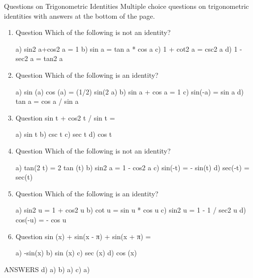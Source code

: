 \documentclass[]{report}
\begin{document}
Questions on Trigonometric Identities
Multiple choice questions on trigonometric identities with answers at the bottom of the page. 

\begin{enumerate}
\item Question Which of the following is not an identity? 

a) sin2 a+cos2 a = 1 
b) sin a = tan a * cos a 
c) 1 + cot2 a = csc2 a 
d) 1 - sec2 a = tan2 a 


\item Question Which of the following is an identity? 

a) sin (a) cos (a) = (1/2) sin(2 a) 
b) sin a + cos a = 1 
c) sin(-a) = sin a 
d) tan a = cos a / sin a 

\item Question 
sin t + cos2 t / sin t = 


a) sin t 
b) csc t 
c) sec t 
d) cos t 



\item Question Which of the following is not an identity? 

a) tan(2 t) = 2 tan (t) 
b) sin2 a = 1 - cos2 a 
c) sin(-t) = - sin(t) 
d) sec(-t) = sec(t) 

\item Question Which of the following is an identity? 

a) sin2 u = 1 + cos2 u 
b) cot u = sin u * cos u 
c) sin2 u = 1 - 1 / sec2 u 
d) cos(-u) = - cos u 
 

\item Question 
sin (x) + sin(x - π) + sin(x + π) = 


a) -sin(x) 
b) sin (x) 
c) sec (x) 
d) cos (x) 
\end{enumerate}

ANSWERS 
d) 
a) 
b) 
a) 
c) 
a) 
\end{document}
